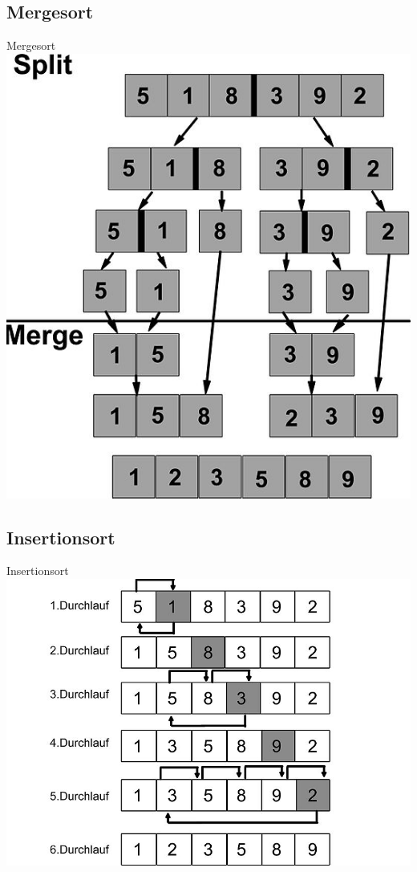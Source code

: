 \documentclass[18pt]{beamer}
\begin{document}
\subsection{Mergesort}
\begin{frame}{Mergesort}
 \includegraphics{MergeSort}
\end{frame}

\subsection{Insertionsort}
\begin{frame}{Insertionsort}
 \includegraphics{InsertionSort}
\end{frame}
\end{document}
